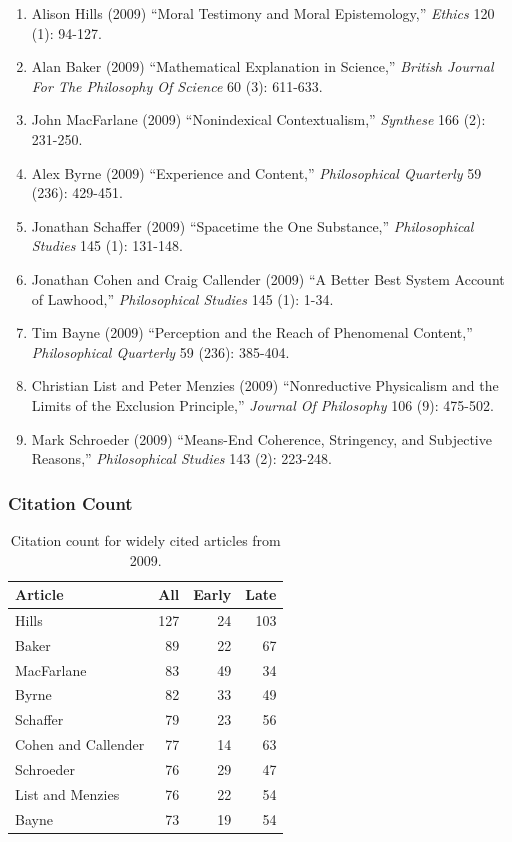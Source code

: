 \documentclass[
  10pt,
  letterpaper,
  DIV=11,
  numbers=noendperiod,
  twoside]{scrartcl}
\providecommand{\tightlist}{%
  \setlength{\itemsep}{0pt}\setlength{\parskip}{0pt}}\usepackage{longtable,booktabs,array}
\begin{document}
\begin{enumerate}
\def\labelenumi{\arabic{enumi}.}
\tightlist
\item
  Alison Hills (2009) ``Moral Testimony and Moral Epistemology,''
  \emph{Ethics} 120 (1): 94-127.
\item
  Alan Baker (2009) ``Mathematical Explanation in Science,''
  \emph{British Journal For The Philosophy Of Science} 60 (3): 611-633.
\item
  John MacFarlane (2009) ``Nonindexical Contextualism,'' \emph{Synthese}
  166 (2): 231-250.
\item
  Alex Byrne (2009) ``Experience and Content,'' \emph{Philosophical
  Quarterly} 59 (236): 429-451.
\item
  Jonathan Schaffer (2009) ``Spacetime the One Substance,''
  \emph{Philosophical Studies} 145 (1): 131-148.
\item
  Jonathan Cohen and Craig Callender (2009) ``A Better Best System
  Account of Lawhood,'' \emph{Philosophical Studies} 145 (1): 1-34.
\item
  Tim Bayne (2009) ``Perception and the Reach of Phenomenal Content,''
  \emph{Philosophical Quarterly} 59 (236): 385-404.
\item
  Christian List and Peter Menzies (2009) ``Nonreductive Physicalism and
  the Limits of the Exclusion Principle,'' \emph{Journal Of Philosophy}
  106 (9): 475-502.
\item
  Mark Schroeder (2009) ``Means-End Coherence, Stringency, and
  Subjective Reasons,'' \emph{Philosophical Studies} 143 (2): 223-248.
\end{enumerate}

\subsubsection*{Citation Count}\label{sec-count-2009}

\begin{longtable}[]{@{}lrrr@{}}

\caption{\label{tbl-citation-count-2009}Citation count for widely cited
articles from 2009.}

\tabularnewline

\toprule\noalign{}
Article & All & Early & Late \\
\midrule\noalign{}
\endhead
\bottomrule\noalign{}
\endlastfoot
Hills & 127 & 24 & 103 \\
Baker & 89 & 22 & 67 \\
MacFarlane & 83 & 49 & 34 \\
Byrne & 82 & 33 & 49 \\
Schaffer & 79 & 23 & 56 \\
Cohen and Callender & 77 & 14 & 63 \\
Schroeder & 76 & 29 & 47 \\
List and Menzies & 76 & 22 & 54 \\
Bayne & 73 & 19 & 54 \\

\end{longtable}
\end{document}
